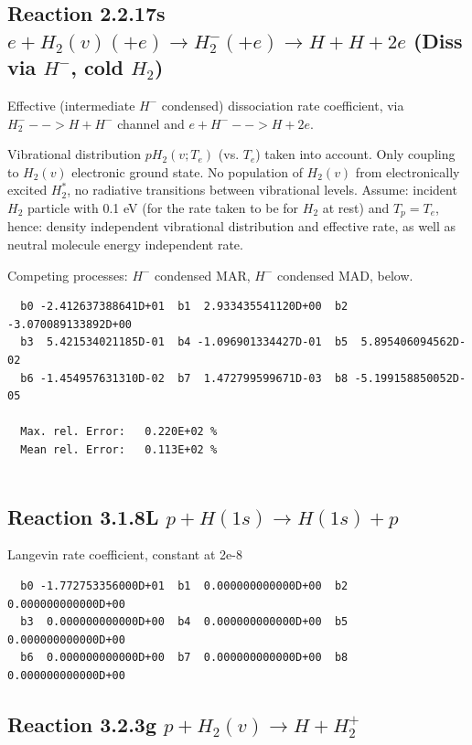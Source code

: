 \documentclass[12pt,dvipdfmx]{article}
\begin{document}
\newpage

\subsection{
Reaction 2.2.17s  $e + H_2(v) (+e) \rightarrow H_2^- (+e)\rightarrow H + H +2e $  (Diss via $H^-$, cold $H_2$)
}
Effective (intermediate $H^-$ condensed) dissociation rate coefficient,
via $H_2^- --> H + H^-$ channel and $ e + H^- --> H + 2e$.


Vibrational distribution $pH_2(v;T_e)$ (vs. $T_e$) taken into
account. Only coupling
to $H_2(v)$ electronic ground state. No population of $H_2(v)$ from electronically
excited $H_2^*$, no radiative transitions between vibrational levels.
Assume: incident $H_2$ particle with 0.1 eV
(for the rate taken to be for $H_2$ at rest) and $T_p = T_e$,
hence: density independent vibrational distribution and effective
rate, as well as neutral molecule energy independent rate.

Competing processes: $H^-$ condensed MAR,  $H^-$ condensed MAD, below.

\begin{small}\begin{verbatim}
  b0 -2.412637388641D+01  b1  2.933435541120D+00  b2 -3.070089133892D+00
  b3  5.421534021185D-01  b4 -1.096901334427D-01  b5  5.895406094562D-02
  b6 -1.454957631310D-02  b7  1.472799599671D-03  b8 -5.199158850052D-05

  Max. rel. Error:   0.220E+02 %
  Mean rel. Error:   0.113E+02 %


\end{verbatim}\end{small}

\subsection{
Reaction 3.1.8L   $p + H(1s) \rightarrow H(1s) + p  $
}
Langevin rate coefficient, constant at 2e-8


\begin{small}\begin{verbatim}
  b0 -1.772753356000D+01  b1  0.000000000000D+00  b2  0.000000000000D+00
  b3  0.000000000000D+00  b4  0.000000000000D+00  b5  0.000000000000D+00
  b6  0.000000000000D+00  b7  0.000000000000D+00  b8  0.000000000000D+00
\end{verbatim}\end{small}


\subsection{
Reaction 3.2.3g   $p + H_2(v) \rightarrow H + H_2^+  $
}
\end{document}
